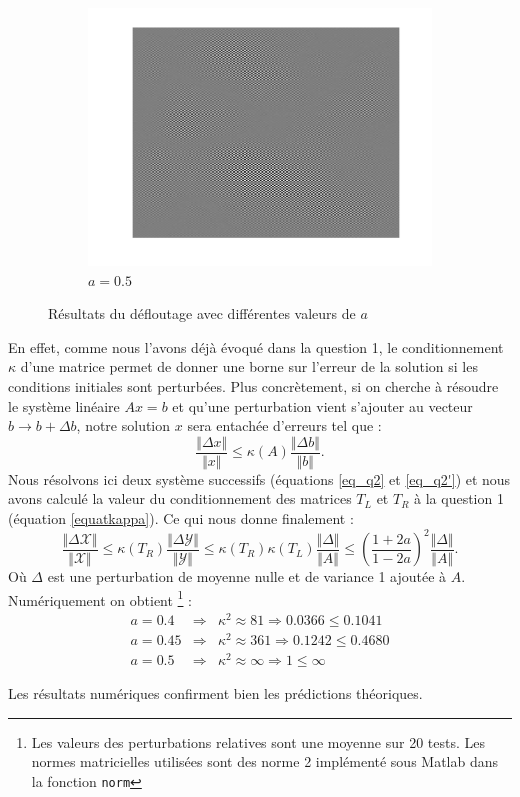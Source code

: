 \begin{figure}
\begin{subfigure}[b]{0.3\textwidth}
    \includegraphics[width=\textwidth]{Q2/unblurred_50.png}
    \caption{$a = 0.5$}
    \label{fig:a5}
  \end{subfigure}
  \caption{Résultats du défloutage avec différentes valeurs de $a$}\label{fig:adiff}
\end{figure}



En effet, comme nous l'avons déjà évoqué dans la question 1, le conditionnement $\kappa$ d'une matrice permet de donner une borne sur l'erreur de la solution si les conditions initiales sont perturbées. Plus concrètement, si on cherche à résoudre le système linéaire $Ax=b$ et qu'une perturbation vient s'ajouter au vecteur $b\rightarrow b+\Delta b$, notre solution $x$ sera entachée d'erreurs tel que : 
$$\frac{\Vert \Delta x \Vert}{\Vert x \Vert} \leq \kappa(A) \frac{\Vert \Delta b \Vert}{\Vert b \Vert}. $$ 
Nous résolvons ici deux système successifs (équations \ref{eq_q2} et \ref{eq_q2'}) et nous avons calculé la valeur du conditionnement des matrices $T_L$ et $T_R$ à la question 1 (équation \ref{equatkappa}). Ce qui nous donne finalement : 
$$\frac{\Vert \Delta \mathcal{X} \Vert}{\Vert \mathcal{X} \Vert} \leq \kappa (T_R) \frac{\Vert \Delta \mathcal{Y} \Vert}{\Vert \mathcal{Y} \Vert} \leq \kappa(T_R) \kappa (T_L) \frac{\Vert \Delta \Vert}{\Vert A \Vert} \leq \left(\frac{1+2a}{1-2a}\right)^2  \frac{\Vert \Delta \Vert}{\Vert A \Vert}. $$
Où $\Delta$ est une perturbation de moyenne nulle et de variance 1 ajoutée à $A$. Numériquement on obtient \footnote{Les valeurs des perturbations relatives sont une moyenne sur 20 tests. Les normes matricielles utilisées sont des norme 2 implémenté sous Matlab dans la fonction \texttt{norm}} : 
\begin{eqnarray}
a=0.4  &\Longrightarrow & \kappa^2 \approx 81 \Longrightarrow 0.0366 \leq  0.1041\\
a=0.45  &\Longrightarrow & \kappa^2 \approx 361 \Longrightarrow  0.1242 \leq  0.4680\\
a=0.5  &\Longrightarrow &  \kappa^2 \approx \infty \Longrightarrow 1 \leq \infty 
\end{eqnarray}

Les résultats numériques confirment bien les prédictions théoriques.














